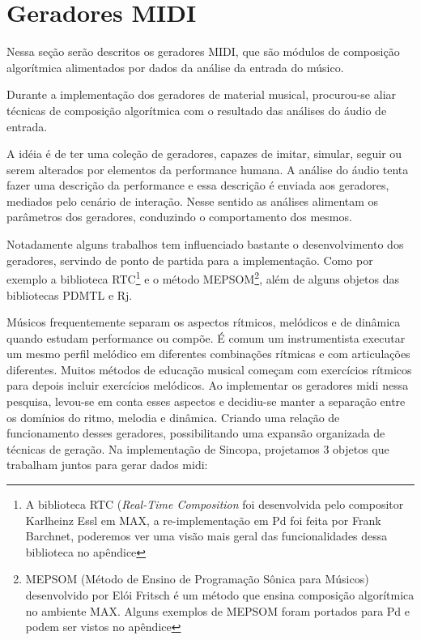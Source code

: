 \documentclass{ppgmus}
\begin{document}
\pagebreak





\section{Geradores MIDI}


Nessa seção serão descritos os geradores MIDI, que
são módulos de composição algorítmica alimentados
por dados da análise da entrada do músico.

Durante a implementação dos geradores de material musical,
procurou-se aliar técnicas de composição algorítmica com
o resultado das análises do áudio de entrada.


A idéia é de ter uma coleção de geradores, capazes
de imitar, simular, seguir ou serem alterados por elementos da performance humana. A análise do áudio
tenta fazer uma descrição da performance e essa descrição
é enviada aos geradores, mediados pelo cenário de interação.
Nesse sentido as análises alimentam os parâmetros dos
geradores, conduzindo o comportamento dos mesmos.



Notadamente alguns trabalhos tem influenciado bastante o desenvolvimento
dos geradores, servindo de ponto de partida para a implementação. Como
por exemplo a biblioteca RTC\footnote{A biblioteca RTC (\textit{Real-Time Composition} 
foi desenvolvida pelo compositor Karlheinz Essl em MAX, a re-implementação
em Pd foi feita por Frank Barchnet, poderemos ver uma visão mais geral
das funcionalidades dessa biblioteca no apêndice} e o método MEPSOM\footnote{
MEPSOM (Método de Ensino de Programação Sônica para Músicos) desenvolvido por
Elói Fritsch é um método que ensina composição algorítmica no ambiente MAX. Alguns
exemplos de MEPSOM foram portados para Pd e podem ser vistos no apêndice}, além
de alguns objetos das bibliotecas PDMTL e Rj.  


Músicos frequentemente separam os aspectos rítmicos, melódicos e de dinâmica
quando estudam performance ou compõe. É comum um instrumentista executar um 
mesmo perfil melódico em diferentes combinações rítmicas e com articulações
diferentes. Muitos métodos de educação musical começam com exercícios rítmicos
para depois incluir exercícios melódicos. Ao implementar os geradores midi
nessa pesquisa, levou-se em conta esses aspectos e decidiu-se manter a separação
entre os domínios do ritmo, melodia e dinâmica. Criando uma relação de funcionamento
desses geradores, possibilitando uma expansão organizada de técnicas de geração.
Na implementação de Sincopa, projetamos 3 objetos que trabalham juntos para
gerar dados midi: 
\end{document}
